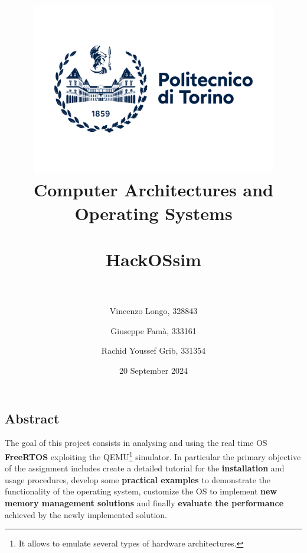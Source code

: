 \documentclass{article}
\title{
    \includegraphics[width=0.8\textwidth]{img/logo/polito_logo_2021_blu.jpg}
    \\[1cm]
    Computer Architectures and Operating Systems
    \\[0.5cm] \hrulefill \\[0.5cm]
    HackOSsim
    \\[0.5cm] \hrulefill \\[0.5cm]
  }
\author{
  Vincenzo Longo, 328843 \and
  Giuseppe Famà, 333161  \and
  Rachid Youssef Grib, 331354 
}
\date{20 September 2024}
\begin{document}
\maketitle
\newpage
\begin{center}
    \section*{Abstract}
\end{center}
The goal of this project consists in analysing and using the real time OS \textbf{FreeRTOS} exploiting the QEMU\footnote{It allows to emulate several types of hardware architectures.} simulator. In particular the primary objective of the assignment includes create a detailed tutorial for the \textbf{installation} and usage procedures, develop some \textbf{practical examples} to demonstrate the functionality of the operating system, customize the OS to implement \textbf{new memory management solutions} and finally \textbf{evaluate the performance} achieved by the newly implemented solution.
\newpage
\tableofcontents
\newpage









\end{document}
